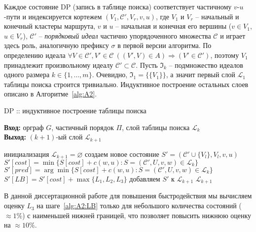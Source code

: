 Каждое состояние DP
(запись в таблице поиска)
соответствует частичному
$v$-$u$-пути
и индексируется кортежем
$(V_1, \mathcal C',V_r,v, u)$, где
$V_1$ и $V_r$ -- начальный и конечный кластеры маршрута,
$v$ и $u$ -- начальная и конечная его вершины ($v\in V_1$, $u\in V_r$),
$\mathcal C'$ -- {\it порядковый идеал} частично упорядоченного множества $\mathcal C$
и играет здесь роль, аналогичную префиксу $\sigma$
в первой версии алгоритма.
По определению идеала
\(
    \forall V\in\mathcal C', V'\in\mathcal C\
    \left((V',V)\in A\right)
    \Rightarrow (V'\in\mathcal C')
\),
поэтому $V_1$
принадлежит произвольному идеалу
$\mathcal C'\subset\mathcal C$.
Пусть $\mathfrak I_k$
-- подмножество идеалов одного размера
$k\in\{1,\ldots,m\}$.
Очевидно,
$\mathfrak I_1=\{\{V_1\}\}$,
а значит первый слой
$\mathcal L_1$
таблицы поиска строится тривиально.
Индуктивное построение остальных слоев
описано в Алгоритме~\ref{alg:A2}.

\begin{algorithm}[t]
  \caption{DP ::  индуктивное построение таблицы поиска}\label{alg:A2}
  \textbf{Вход:} орграф $G$, частичный порядок $\Pi$, слой таблицы поиска $\mathcal L_k$\\
  \textbf{Выход:} $(k+1)$-ый слой $\mathcal L_{k+1}$
  \begin{algorithmic}[1]
  \STATE инициализация $\mathcal L_{k+1}=\varnothing$
      \FORALL{$v\in V_1$ и $u\in V_l$}
        \STATE создаем новое состояние $S'=(\mathcal C'\cup\{V_l\}, V_l, v, u)$
        \STATE $S'[cost] = \min\{S[cost] + c(w,u)\colon S=(\mathcal C',U,v,w)\in\mathcal L_k\}$
        \STATE $S'[pred] = \arg\min\{S[cost] + c(w,u)\colon S=(\mathcal C',U,v,w)\in\mathcal L_k\}$
        \STATE $S'[LB] = S'[cost] + \max\{L_1,L_2,L_3\}$
          \label{alg:A2:LB}
            \label{alg:A2:cut}
          \STATE добавляем $S'$ к $\mathcal L_{k+1}$
        \ENDIF
      \ENDIF
      \ENDFOR
    \ENDFOR
  \ENDFOR
  \RETURN $\mathcal L_{k+1}$
  \end{algorithmic}
\end{algorithm}

В данной диссертационной работе
для повышения быстродействия
мы вычисляем оценку $L_3$
на шаге~\ref{alg:A2:LB}
только для небольшого количества состояний
($\approx 1\%$)
с наименьшей нижней границей,
что позволяет повысить нижнюю оценку на
$\approx 10\%$.

